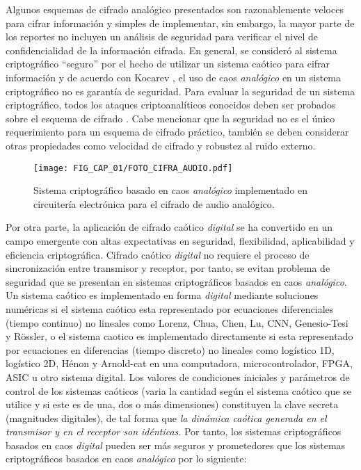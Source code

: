 Algunos esquemas de cifrado analógico presentados son razonablemente veloces para cifrar información y simples de implementar, sin embargo, la mayor parte de los reportes no incluyen un análisis de seguridad para verificar el nivel de confidencialidad de la información cifrada. En general, se consideró al sistema criptográfico ``seguro'' por el hecho de utilizar un sistema caótico para cifrar información y de acuerdo con Kocarev \cite{K_2001}, el uso de caos \textit{analógico} en un sistema criptográfico no es garantía de seguridad. Para evaluar la seguridad de un sistema criptográfico, todos los ataques criptoanalíticos conocidos deben ser probados sobre el esquema de cifrado \cite{LEtAl_2007}. Cabe mencionar que la seguridad no es el único requerimiento para un esquema de cifrado práctico, también se deben considerar otras propiedades como velocidad de cifrado y robustez al ruido externo.  \\

\begin{figure}[!htbp] %
	\center
	\texttt{[image: FIG\_CAP\_01/FOTO\_CIFRA\_AUDIO.pdf]}  
	\caption{Sistema criptográfico basado en caos \textit{analógico} implementado en circuitería electrónica para el cifrado de audio analógico.}
\end{figure}

Por otra parte, la aplicación de cifrado caótico \textit{digital} se ha convertido en un campo emergente con altas expectativas en seguridad, flexibilidad, aplicabilidad y eficiencia criptográfica. Cifrado caótico \textit{digital} no requiere el proceso de sincronización entre transmisor y receptor, por tanto, se evitan problema de seguridad que se presentan en sistemas criptográficos basados en caos \textit{analógico}. Un sistema caótico es implementado en forma \textit{digital} mediante soluciones numéricas si el sistema caótico esta representado por ecuaciones diferenciales (tiempo continuo) no lineales como Lorenz, Chua, Chen, Lu, CNN, Genesio-Tesi y R\"{o}ssler, o el sistema caotico es implementado directamente si esta representado por ecuaciones en diferencias (tiempo discreto) no lineales como logístico 1D, logístico 2D, Hénon y Arnold-cat en una computadora, microcontrolador, FPGA, ASIC u otro sistema digital. Los valores de condiciones iniciales y parámetros de control de los sistemas caóticos (varia la cantidad según el sistema caótico que se utilice y si este es de una, dos o más dimensiones) constituyen la clave secreta (magnitudes digitales), de tal forma que \textit{la dinámica caótica generada en el transmisor y en el receptor son idénticas}. Por tanto, los sistemas criptográficos basados en caos \textit{digital} pueden ser más seguros y prometedores que los sistemas criptográficos basados en caos \textit{analógico} por lo siguiente:

